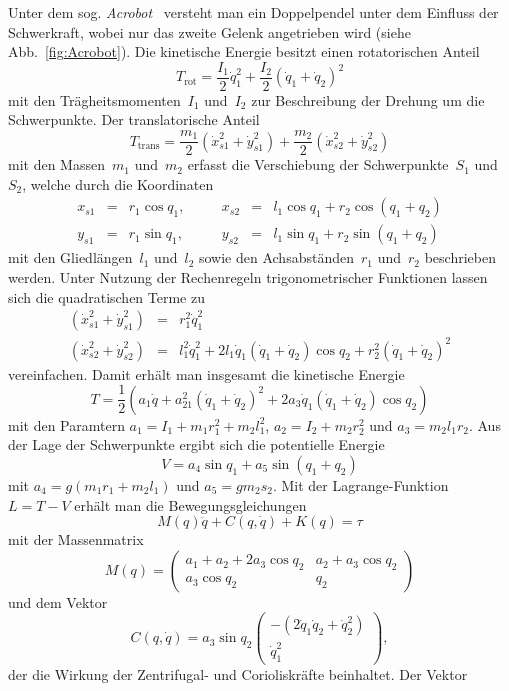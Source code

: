 \begin{example}
\label{exa:Acrobot-max-rel-grad}Unter dem sog. \emph{Acrobot}~\cite{hauser1990acrobot,spong1995}
versteht man ein Doppelpendel unter dem Einfluss der Schwerkraft,
wobei nur das zweite Gelenk angetrieben wird (siehe Abb.~\ref{fig:Acrobot}).
Die kinetische Energie besitzt einen rotatorischen Anteil 
\[
T_{\text{rot}}=\frac{I_{1}}{2}\dot{q}_{1}^{2}+\frac{I_{2}}{2}\left(\dot{q}_{1}+\dot{q}_{2}\right)^{2}
\]
mit den Trägheitsmomenten~$I_{1}$ und~$I_{2}$ zur Beschreibung
der Drehung um die Schwerpunkte. Der translatorische Anteil
\[
T_{\text{trans}}=\frac{m_{1}}{2}\left(\dot{x}_{s1}^{2}+\dot{y}_{s1}^{2}\right)+\frac{m_{2}}{2}\left(\dot{x}_{s2}^{2}+\dot{y}_{s2}^{2}\right)
\]
mit den Massen~$m_{1}$ und~$m_{2}$ erfasst die Verschiebung der
Schwerpunkte~$S_{1}$ und~$S_{2}$, welche durch die Koordinaten
\[
\begin{array}{lclclcl}
x_{s1} & = & r_{1}\cos q_{1}, & \quad & x_{s2} & = & l_{1}\cos q_{1}+r_{2}\cos(q_{1}+q_{2})\\
y_{s1} & = & r_{1}\sin q_{1}, &  & y_{s2} & = & l_{1}\sin q_{1}+r_{2}\sin(q_{1}+q_{2})
\end{array}
\]
mit den Gliedlängen~$l_{1}$ und~$l_{2}$ sowie den Achsabständen~$r_{1}$
und~$r_{2}$ beschrieben werden. Unter Nutzung der Rechenregeln trigonometrischer
Funktionen lassen sich die quadratischen Terme zu
\[
\begin{array}{lcl}
(\dot{x}_{s1}^{2}+\dot{y}_{s1}^{2}) & = & r_{1}^{2}\dot{q}_{1}^{2}\\
(\dot{x}_{s2}^{2}+\dot{y}_{s2}^{2}) & = & l_{1}^{2}\dot{q}_{1}^{2}+2l_{1}\dot{q}_{1}(\dot{q}_{1}+\dot{q}_{2})\cos q_{2}+r_{2}^{2}(\dot{q}_{1}+\dot{q}_{2})^{2}
\end{array}
\]
vereinfachen. Damit erhält man insgesamt die kinetische Energie 
\[
T=\frac{1}{2}\left(a_{1}\dot{q}+a_{21}^{2}(\dot{q}_{1}+\dot{q}_{2})^{2}+2a_{3}\dot{q}_{1}(\dot{q}_{1}+\dot{q}_{2})\cos q_{2}\right)
\]
mit den Paramtern $a_{1}=I_{1}+m_{1}r_{1}^{2}+m_{2}l_{1}^{2}$, $a_{2}=I_{2}+m_{2}r_{2}^{2}$
und $a_{3}=m_{2}l_{1}r_{2}$. Aus der Lage der Schwerpunkte ergibt
sich die potentielle Energie
\[
V=a_{4}\sin q_{1}+a_{5}\sin(q_{1}+q_{2})
\]
mit $a_{4}=g(m_{1}r_{1}+m_{2}l_{1})$ und $a_{5}=gm_{2}s_{2}$. Mit
der Lagrange-Funktion $L=T-V$ erhält man die Bewegungsgleichungen
\[
M(q)\ddot{q}+C(q,\dot{q})+K(q)=\tau
\]
mit der Massenmatrix
\begin{equation}
M(q)=\left(\begin{array}{cc}
a_{1}+a_{2}+2a_{3}\cos q_{2} & a_{2}+a_{3}\cos q_{2}\\
a_{3}\cos q_{2} & q_{2}
\end{array}\right)\label{eq:acrobot-M}
\end{equation}
und dem Vektor 
\begin{equation}
C(q,\dot{q})=a_{3}\sin q_{2}\left(\begin{array}{c}
-(2\dot{q}_{1}\dot{q}_{2}+\dot{q}_{2}^{2})\\
\dot{q}_{1}^{2}
\end{array}\right),\label{eq:acrobot-C}
\end{equation}
der die Wirkung der Zentrifugal- und Corioliskräfte beinhaltet. Der
Vektor


\end{example}
